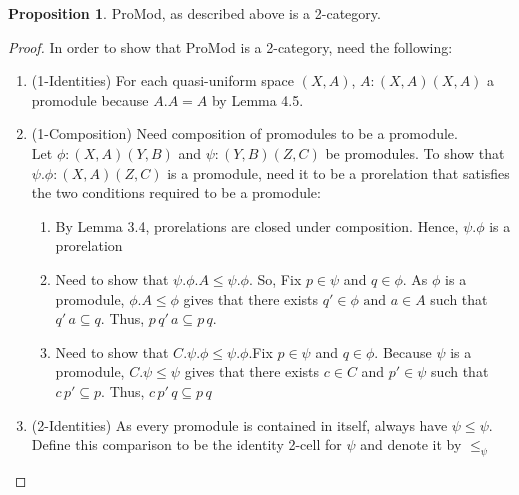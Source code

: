 \documentclass[a4paper]{article}
\makeatletter
\theoremstyle{definition}
\newtheorem{prop}[theorem]{Proposition}
\newcommand{\carrow}{}%
\DeclareRobustCommand{\carrow}{%
	\mathrel{\vphantom{\rightarrow}\mathpalette\circle@arrow\relax}%
}
\newcommand{\circle@arrow}[2]{%
	\m@th
	\ooalign{%
		\hidewidth$#1\circ\mkern1mu$\hidewidth\cr
	$#1\longrightarrow$\cr}%
}
\makeatother
\begin{document}
			\begin{prop}%
				ProMod, as described above is a 2-category.
			\end{prop}
			\begin{proof}\setcounter{equation}{0}
				In order to show that ProMod is a 2-category, need the following:
				\begin{enumerate}[label=(\alph*)]
					\item (1-Identities) For each quasi-uniform space $(X,A)$,
						$A:(X,A) \carrow (X,A)$ a promodule because $A.A=A$ by Lemma 4.5.
					\item (1-Composition) Need composition of promodules to be a promodule.\\
						Let $\phi:(X,A)\carrow (Y,B)$ and $\psi:(Y,B)\carrow (Z,C)$ be promodules.
						To show that $\psi.\phi:(X,A) \carrow (Z,C)$ is a promodule, need it to be a
						prorelation that satisfies the two conditions required to be a promodule:
						\begin{enumerate}[label=(\roman*)]
							\item By Lemma 3.4, prorelations are closed under composition.
								Hence, $\psi.\phi$ is a prorelation
							\item Need to show that $\psi.\phi.A \leq \psi.\phi$. So, Fix
								$p \in \psi$ and $q \in \phi$. As $\phi$ is a promodule,
								$\phi.A\leq \phi$ gives that there exists
								$ q' \in \phi \text{ and } a\in A$ such that
								$q'\,a \subseteq q$. Thus,
								$p\,q'\,a \subseteq p\,q$.
							\item Need to show that $C.\psi.\phi \leq \psi.\phi$.Fix $p \in \psi$
								and $q\in \phi$. Because
								$\psi$ is a promodule, $C.\psi \leq \psi$ gives that
								there exists $c\in C$ and $p' \in \psi$ such that
								$c\,p' \subseteq p$. Thus, $c\,p'\,q \subseteq p\,q$
						\end{enumerate}
					\item (2-Identities) As every promodule is contained in itself, always have $\psi \leq \psi$.
						Define this comparison to be the identity 2-cell for $\psi$ and denote it by $\leq_\psi$


\end{enumerate}
\end{proof}
\end{document}
